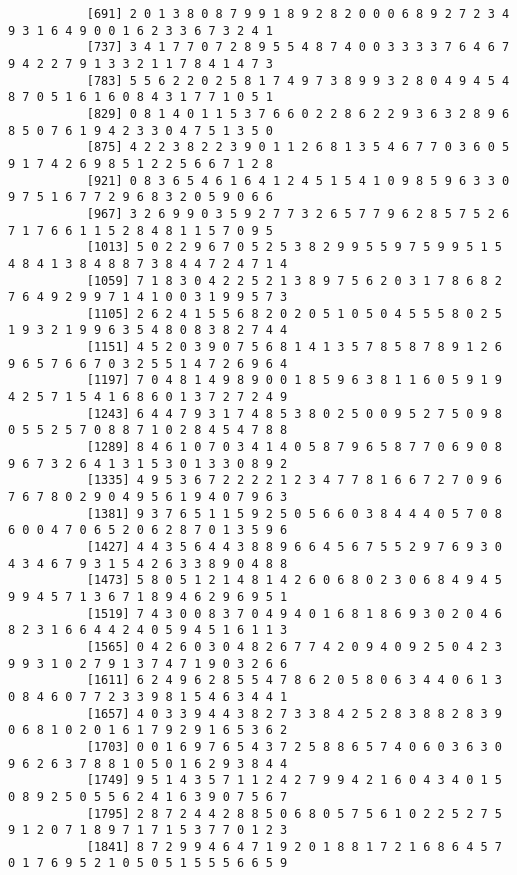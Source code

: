 \documentclass{article}
\begin{document}
\begin{itemize}
\begin{scriptsize}
\begin{verbatim}
		   [691] 2 0 1 3 8 0 8 7 9 9 1 8 9 2 8 2 0 0 0 6 8 9 2 7 2 3 4 9 3 1 6 4 9 0 0 1 6 2 3 3 6 7 3 2 4 1
		   [737] 3 4 1 7 7 0 7 2 8 9 5 5 4 8 7 4 0 0 3 3 3 3 7 6 4 6 7 9 4 2 2 7 9 1 3 3 2 1 1 7 8 4 1 4 7 3
		   [783] 5 5 6 2 2 0 2 5 8 1 7 4 9 7 3 8 9 9 3 2 8 0 4 9 4 5 4 8 7 0 5 1 6 1 6 0 8 4 3 1 7 7 1 0 5 1
		   [829] 0 8 1 4 0 1 1 5 3 7 6 6 0 2 2 8 6 2 2 9 3 6 3 2 8 9 6 8 5 0 7 6 1 9 4 2 3 3 0 4 7 5 1 3 5 0
		   [875] 4 2 2 3 8 2 2 3 9 0 1 1 2 6 8 1 3 5 4 6 7 7 0 3 6 0 5 9 1 7 4 2 6 9 8 5 1 2 2 5 6 6 7 1 2 8
		   [921] 0 8 3 6 5 4 6 1 6 4 1 2 4 5 1 5 4 1 0 9 8 5 9 6 3 3 0 9 7 5 1 6 7 7 2 9 6 8 3 2 0 5 9 0 6 6
		   [967] 3 2 6 9 9 0 3 5 9 2 7 7 3 2 6 5 7 7 9 6 2 8 5 7 5 2 6 7 1 7 6 6 1 1 5 2 8 4 8 1 1 5 7 0 9 5
		   [1013] 5 0 2 2 9 6 7 0 5 2 5 3 8 2 9 9 5 5 9 7 5 9 9 5 1 5 4 8 4 1 3 8 4 8 8 7 3 8 4 4 7 2 4 7 1 4
		   [1059] 7 1 8 3 0 4 2 2 5 2 1 3 8 9 7 5 6 2 0 3 1 7 8 6 8 2 7 6 4 9 2 9 9 7 1 4 1 0 0 3 1 9 9 5 7 3
		   [1105] 2 6 2 4 1 5 5 6 8 2 0 2 0 5 1 0 5 0 4 5 5 5 8 0 2 5 1 9 3 2 1 9 9 6 3 5 4 8 0 8 3 8 2 7 4 4
		   [1151] 4 5 2 0 3 9 0 7 5 6 8 1 4 1 3 5 7 8 5 8 7 8 9 1 2 6 9 6 5 7 6 6 7 0 3 2 5 5 1 4 7 2 6 9 6 4
		   [1197] 7 0 4 8 1 4 9 8 9 0 0 1 8 5 9 6 3 8 1 1 6 0 5 9 1 9 4 2 5 7 1 5 4 1 6 8 6 0 1 3 7 2 7 2 4 9
		   [1243] 6 4 4 7 9 3 1 7 4 8 5 3 8 0 2 5 0 0 9 5 2 7 5 0 9 8 0 5 5 2 5 7 0 8 8 7 1 0 2 8 4 5 4 7 8 8
		   [1289] 8 4 6 1 0 7 0 3 4 1 4 0 5 8 7 9 6 5 8 7 7 0 6 9 0 8 9 6 7 3 2 6 4 1 3 1 5 3 0 1 3 3 0 8 9 2
		   [1335] 4 9 5 3 6 7 2 2 2 2 1 2 3 4 7 7 8 1 6 6 7 2 7 0 9 6 7 6 7 8 0 2 9 0 4 9 5 6 1 9 4 0 7 9 6 3
		   [1381] 9 3 7 6 5 1 1 5 9 2 5 0 5 6 6 0 3 8 4 4 4 0 5 7 0 8 6 0 0 4 7 0 6 5 2 0 6 2 8 7 0 1 3 5 9 6
		   [1427] 4 4 3 5 6 4 4 3 8 8 9 6 6 4 5 6 7 5 5 2 9 7 6 9 3 0 4 3 4 6 7 9 3 1 5 4 2 6 3 3 8 9 0 4 8 8
		   [1473] 5 8 0 5 1 2 1 4 8 1 4 2 6 0 6 8 0 2 3 0 6 8 4 9 4 5 9 9 4 5 7 1 3 6 7 1 8 9 4 6 2 9 6 9 5 1
		   [1519] 7 4 3 0 0 8 3 7 0 4 9 4 0 1 6 8 1 8 6 9 3 0 2 0 4 6 8 2 3 1 6 6 4 4 2 4 0 5 9 4 5 1 6 1 1 3
		   [1565] 0 4 2 6 0 3 0 4 8 2 6 7 7 4 2 0 9 4 0 9 2 5 0 4 2 3 9 9 3 1 0 2 7 9 1 3 7 4 7 1 9 0 3 2 6 6
		   [1611] 6 2 4 9 6 2 8 5 5 4 7 8 6 2 0 5 8 0 6 3 4 4 0 6 1 3 0 8 4 6 0 7 7 2 3 3 9 8 1 5 4 6 3 4 4 1
		   [1657] 4 0 3 3 9 4 4 3 8 2 7 3 3 8 4 2 5 2 8 3 8 8 2 8 3 9 0 6 8 1 0 2 0 1 6 1 7 9 2 9 1 6 5 3 6 2
		   [1703] 0 0 1 6 9 7 6 5 4 3 7 2 5 8 8 6 5 7 4 0 6 0 3 6 3 0 9 6 2 6 3 7 8 8 1 0 5 0 1 6 2 9 3 8 4 4
		   [1749] 9 5 1 4 3 5 7 1 1 2 4 2 7 9 9 4 2 1 6 0 4 3 4 0 1 5 0 8 9 2 5 0 5 5 6 2 4 1 6 3 9 0 7 5 6 7
		   [1795] 2 8 7 2 4 4 2 8 8 5 0 6 8 0 5 7 5 6 1 0 2 2 5 2 7 5 9 1 2 0 7 1 8 9 7 1 7 1 5 3 7 7 0 1 2 3
		   [1841] 8 7 2 9 9 4 6 4 7 1 9 2 0 1 8 8 1 7 2 1 6 8 6 4 5 7 0 1 7 6 9 5 2 1 0 5 0 5 1 5 5 5 6 6 5 9

\end{verbatim}
\end{scriptsize}
\end{itemize}
\end{document}

